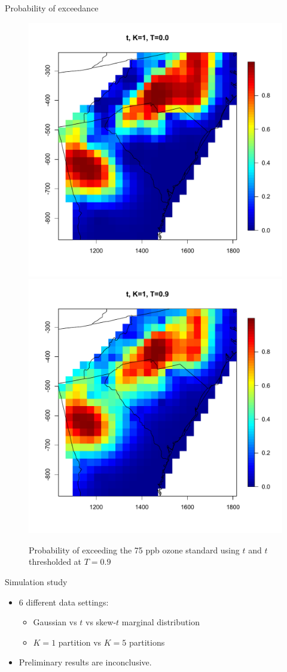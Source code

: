 \documentclass{beamer}
\begin{document}
\begin{frame}{Probability of exceedance}
\centering
\begin{figure}
    \includegraphics[width=.5\linewidth]{./plots/p-exceed-std-t10.pdf}
    \includegraphics[width=.5\linewidth]{./plots/p-exceed-std-t19.pdf}
    \caption{Probability of exceeding the 75 ppb ozone standard using $t$ and $t$ thresholded at $T=0.9$}
\end{figure}
\end{frame}

\begin{frame}{Simulation study}
  \begin{itemize} \setlength{\itemsep}{0.5em}
    \item 6 different data settings:
    \begin{itemize}
    	\item Gaussian vs $t$ vs skew-$t$ marginal distribution
        \item $K=1$ partition vs $K=5$ partitions
    \end{itemize}
    \item Preliminary results are inconclusive.
  \end{itemize}
\end{frame}
\end{document}
